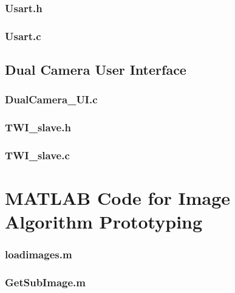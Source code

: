 \subsubsection{Usart.h}


\subsubsection{Usart.c}



\subsection{Dual Camera User Interface}

\subsubsection{DualCamera\_UI.c}


\subsubsection{TWI\_slave.h}


\subsubsection{TWI\_slave.c}


\section{MATLAB Code for Image Algorithm Prototyping}

\subsubsection{loadimages.m}


\subsubsection{GetSubImage.m}



